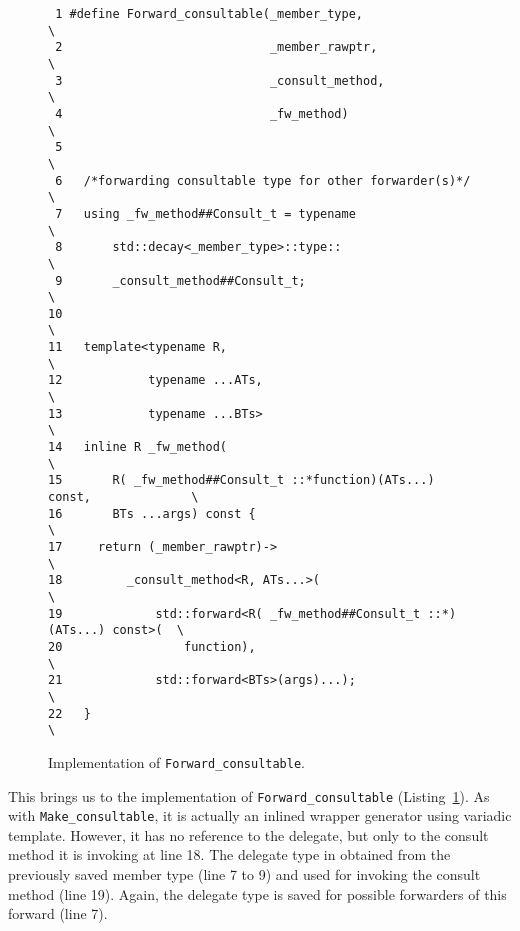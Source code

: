 \documentclass{article}
\begin{document}
\begin{figure}[ht]
{\small
\begin{lstlisting}
 1 #define Forward_consultable(_member_type,                               \
 2                             _member_rawptr,                             \
 3                             _consult_method,                            \
 4                             _fw_method)                                 \
 5                                                                         \
 6   /*forwarding consultable type for other forwarder(s)*/                \
 7   using _fw_method##Consult_t = typename                                \
 8       std::decay<_member_type>::type::                                  \
 9       _consult_method##Consult_t;                                       \
10                                                                         \
11   template<typename R,                                                  \
12            typename ...ATs,                                             \
13            typename ...BTs>                                             \
14   inline R _fw_method(                                                  \
15       R( _fw_method##Consult_t ::*function)(ATs...) const,              \
16       BTs ...args) const {                                              \
17     return (_member_rawptr)->                                           \
18         _consult_method<R, ATs...>(                                     \
19             std::forward<R( _fw_method##Consult_t ::*)(ATs...) const>(  \
20                 function),                                              \
21             std::forward<BTs>(args)...);                                \
22   }                                                                     \
\end{lstlisting}}
\cprotect\caption{Implementation of \verb+Forward_consultable+.}
\label{impl:forward}
\end{figure}

This brings us to the implementation of \verb+Forward_consultable+ (Listing~\ref{impl:forward}). As with \verb+Make_consultable+, it is actually an inlined wrapper generator using variadic template. However, it has no reference to the delegate, but only to the consult method it is invoking at line 18. The delegate type in obtained from the previously saved member type (line 7 to 9) and used for invoking the consult method (line 19). Again, the delegate type is saved for possible forwarders of this forward (line 7).   
\end{document}
